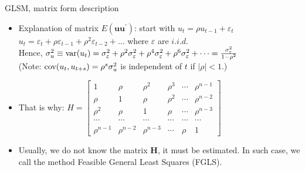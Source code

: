\documentclass{beamer}
\begin{document}
\begin{frame}{GLSM, matrix form description}
\begin{itemize}
\item Explanation of matrix $E(\boldsymbol{uu}^{\prime})$: start with $u_t = \rho u_{t-1}+ \varepsilon_t$\\
$u_t= \varepsilon_t + \rho \varepsilon_{t-1} + \rho^2 \varepsilon_{t-2} + \dots$ \qquad where $\varepsilon$ are $i.i.d.$\\
Hence, $\sigma^2_u \equiv \textnormal{var}(u_t)= 
\sigma^2_{\varepsilon} + \rho^2 \sigma^2_{\varepsilon} + \rho^4 \sigma^2_{\varepsilon} 
+ \rho^6 \sigma^2_{\varepsilon} + \dots
= \frac{\sigma^2_{\varepsilon}}{1-\rho^2}$\\
(Note: $\textnormal{cov}(u_t,u_{t+s})=\rho^s \sigma^2_u$ is independent of $t$ if $|\rho|<1$.)\\
\vspace{0.3cm}
\item That is why: 
$H=\begin{bmatrix}
    1&  \rho & \rho^2 & \rho^3 & \cdots & \rho^{n-1}\\
    \rho &  1&  \rho & \rho^2 & \cdots & \rho^{n-2} \\ 
    \rho^2 &  \rho &  1& \rho  & \cdots & \rho^{n-3} \\ 
    \cdots & \cdots & \cdots & \cdots & \cdots & \cdots \\
     \rho^{n-1} & \rho^{n-2} & \rho^{n-3} & \cdots & \rho & 1
\end{bmatrix}$
\vspace{0.3cm}
\item Usually, we do not know the matrix $\boldsymbol{H}$, it must be estimated. In such case, we call the method Feasible General Least Squares (FGLS).
\end{itemize}
\end{frame}
\end{document}
